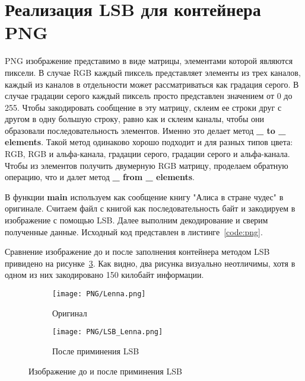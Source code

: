 \section{Реализация LSB для контейнера PNG}
PNG изображение представимо в виде матрицы, элементами которой являются пиксели.
В случае RGB каждый пиксель представляет элементы из трех каналов, каждый из каналов
в отдельности может рассматриваться как градация серого. В случае градации серого каждый
пиксель просто представлен значением от 0 до 255.
Чтобы закодировать сообщение в эту матрицу, склеим ее строки друг с другом в одну большую строку,
равно как и склеим каналы, чтобы они образовали последовательность элементов.
Именно это делает метод \textbf{\_ to \_ elements}.
Такой метод одинаково хорошо подходит и для разных типов цвета: RGB, RGB и альфа-канала,
градации серого, градации серого и альфа-канала.
Чтобы из элементов получить двумерную RGB матрицу,
проделаем обратную операцию, что и далет метод \textbf{\_ from \_ elements}.

В функции \textbf{main} используем как сообщение книгу "Алиса в стране чудес" в оригинале.
Считаем файл с книгой как последовательность байт и закодируем в изображение с помощью LSB.
Далее выполним декодирование и сверим полученные данные.
Исходный код представлен в листинге~\ref{code:png}.

Сравнение изображение до и после заполнения контейнера методом LSB
привидено на рисунке~\ref{img:lsb}.
Как видно, два рисунка визуально неотличимы,
хотя в одном из них закодировано 150 килобайт информации.
\begin{figure}[ht!]
    \centering
    \begin{subfigure}{.5\textwidth}
      \centering
      \texttt{[image: PNG/Lenna.png]}
      \caption{Оригинал}
      \label{img:lenna-png}
    \end{subfigure}%
    \begin{subfigure}{.5\textwidth}
      \centering
      \texttt{[image: PNG/LSB\_Lenna.png]}
      \caption{После приминения LSB}
      \label{img:lenna-lsb}
    \end{subfigure}
    \caption{Изображение до и после приминения LSB}
    \label{img:lsb}
\end{figure}